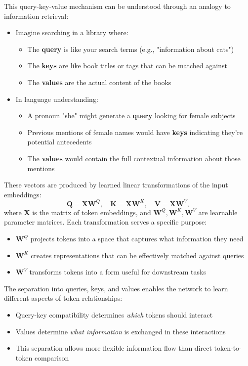 \noindent
This query-key-value mechanism can be understood through an analogy to information retrieval:
\begin{itemize}
    \item Imagine searching in a library where:
    \begin{itemize}
        \item The \textbf{query} is like your search terms (e.g., "information about cats")
        \item The \textbf{keys} are like book titles or tags that can be matched against
        \item The \textbf{values} are the actual content of the books
    \end{itemize}
    \item In language understanding:
    \begin{itemize}
        \item A pronoun "she" might generate a \textbf{query} looking for female subjects
        \item Previous mentions of female names would have \textbf{keys} indicating they're potential antecedents
        \item The \textbf{values} would contain the full contextual information about those mentions
    \end{itemize}
\end{itemize}

\noindent
These vectors are produced by learned linear transformations of the input embeddings:
\[
    \mathbf{Q} = \mathbf{X}\mathbf{W}^Q, 
    \quad
    \mathbf{K} = \mathbf{X}\mathbf{W}^K, 
    \quad
    \mathbf{V} = \mathbf{X}\mathbf{W}^V,
\]
where $\mathbf{X}$ is the matrix of token embeddings, and $\mathbf{W}^Q, \mathbf{W}^K, \mathbf{W}^V$ are learnable parameter matrices. Each transformation serves a specific purpose:
\begin{itemize}
    \item $\mathbf{W}^Q$ projects tokens into a space that captures what information they need
    \item $\mathbf{W}^K$ creates representations that can be effectively matched against queries
    \item $\mathbf{W}^V$ transforms tokens into a form useful for downstream tasks
\end{itemize}

\noindent
The separation into queries, keys, and values enables the network to learn different aspects of token relationships:
\begin{itemize}
    \item Query-key compatibility determines \emph{which} tokens should interact
    \item Values determine \emph{what information} is exchanged in these interactions
    \item This separation allows more flexible information flow than direct token-to-token comparison
\end{itemize}

